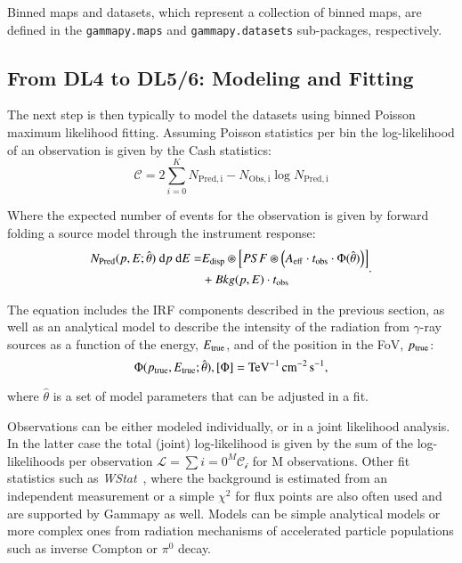 \documentclass[longauth]{aa}
\newcommand{\code}[1]{\texttt{#1}}
\newcommand{\gammapy}{Gammapy\xspace}
\newcommand{\gammaray}{$\gamma$-ray\xspace}
\begin{document}
Binned maps and datasets, which represent a collection of binned
maps, are defined in the \code{gammapy.maps} and \code{gammapy.datasets}
sub-packages, respectively. 


\subsection{From DL4 to DL5/6: Modeling and Fitting}
The next step is then typically to model the datasets using binned Poisson maximum likelihood fitting.
Assuming Poisson statistics per bin the log-likelihood of an observation is given by the Cash statistics\citep{Cash}:
%
\begin{equation}
        \mathcal{C} = 2 \sum_{i=0}^K N_{\mathrm{Pred, i}} - N_{\mathrm{Obs, i}} \log{N_{\mathrm{Pred, i}}} 
\end{equation}

Where the expected number of events for the observation is given by forward folding a source model through
the instrument response:
 \begin{equation}
         \begin{split}
                N_{\mathrm{Pred}}(p, E; \hat{\theta})\ {\rm d}p\ {\rm d}E =  &E_{\rm disp} \circledast \left[ PSF \circledast \left( A_{\rm eff} \cdot t_{\rm obs} \cdot \Phi(\hat{\theta}) \right) \right]\\
                                                & + Bkg(p, E) \cdot t_{\rm obs}
         \end{split}
 .\end{equation}

The equation includes the IRF components described in the previous section, as well as an analytical model to describe the
intensity of the radiation from \gammaray sources as a function of the energy, $E_{\rm true}$,
and of the position in the FoV, $p_{\rm true}$:
%
\begin{equation}
    \Phi(p_{\rm true}, E_{\rm true}; \hat{\theta}), [\Phi] = \si{TeV^{-1}.cm^{-2}.s^{-1}}
    \label{eq:general_source_model}
,\end{equation}

where $\hat{\theta}$ is a set of model parameters that can be adjusted in a fit.

Observations can be either modeled individually, or in a joint likelihood analysis.
In the latter case the total (joint) log-likelihood is given by the sum of the log-likelihoods
per observation $\mathcal{L} = \sum{i=0}^M \mathcal{C_i}$ for M observations. Other fit
statistics such as \emph{WStat}~\citep{WStat}, where the background is estimated from an independent
measurement or a simple $\chi^2$ for flux points are also often used
and are supported by \gammapy as well. Models can be simple analytical models or more complex
ones from radiation mechanisms of accelerated particle populations such as inverse Compton or $\pi^{0}$ decay.
\end{document}
